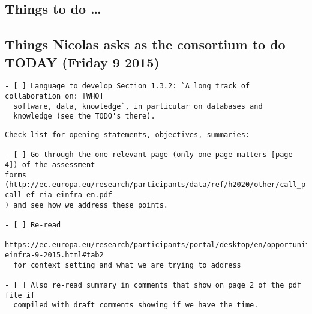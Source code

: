 \documentclass[noworkareas,deliverables,\classoptions]{euproposal}       %
\begin{document}
\begin{proposal}



\begin{draft}
\section*{Things to do \dots}
\subsection*{Things Nicolas asks as the consortium to do TODAY (Friday 9 2015)}
\begin{verbatim}
- [ ] Language to develop Section 1.3.2: `A long track of collaboration on: [WHO]
  software, data, knowledge`, in particular on databases and
  knowledge (see the TODO's there).
\end{verbatim}

\end{draft}
\begin{draft}

\begin{verbatim}
Check list for opening statements, objectives, summaries:

- [ ] Go through the one relevant page (only one page matters [page 4]) of the assessment
forms
(http://ec.europa.eu/research/participants/data/ref/h2020/other/call_ptef/ef/h2020-call-ef-ria_einfra_en.pdf
) and see how we address these points. 

- [ ] Re-read
  https://ec.europa.eu/research/participants/portal/desktop/en/opportunities/h2020/topics/2144-einfra-9-2015.html#tab2
  for context setting and what we are trying to address

- [ ] Also re-read summary in comments that show on page 2 of the pdf file if
  compiled with draft comments showing if we have the time.
\end{verbatim}
\clearpage
\end{draft}





\end{proposal}
\end{document}
